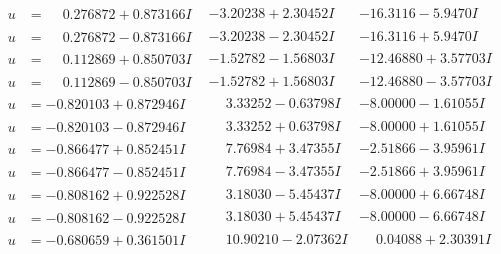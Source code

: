 \documentclass[1p]{elsarticle_modified}
\theoremstyle{definition}
\begin{document}
$$\begin{array}{c|c|c}
\begin{aligned}
u &= \phantom{-}0.276872 + 0.873166 I\end{aligned}
 & -3.20238 + 2.30452 I & -16.3116 - 5.9470 I \\ \hline\begin{aligned}
u &= \phantom{-}0.276872 - 0.873166 I\end{aligned}
 & -3.20238 - 2.30452 I & -16.3116 + 5.9470 I \\ \hline\begin{aligned}
u &= \phantom{-}0.112869 + 0.850703 I\end{aligned}
 & -1.52782 - 1.56803 I & -12.46880 + 3.57703 I \\ \hline\begin{aligned}
u &= \phantom{-}0.112869 - 0.850703 I\end{aligned}
 & -1.52782 + 1.56803 I & -12.46880 - 3.57703 I \\ \hline\begin{aligned}
u &= -0.820103 + 0.872946 I\end{aligned}
 & \phantom{-}3.33252 - 0.63798 I & -8.00000 - 1.61055 I \\ \hline\begin{aligned}
u &= -0.820103 - 0.872946 I\end{aligned}
 & \phantom{-}3.33252 + 0.63798 I & -8.00000 + 1.61055 I \\ \hline\begin{aligned}
u &= -0.866477 + 0.852451 I\end{aligned}
 & \phantom{-}7.76984 + 3.47355 I & -2.51866 - 3.95961 I \\ \hline\begin{aligned}
u &= -0.866477 - 0.852451 I\end{aligned}
 & \phantom{-}7.76984 - 3.47355 I & -2.51866 + 3.95961 I \\ \hline\begin{aligned}
u &= -0.808162 + 0.922528 I\end{aligned}
 & \phantom{-}3.18030 - 5.45437 I & -8.00000 + 6.66748 I \\ \hline\begin{aligned}
u &= -0.808162 - 0.922528 I\end{aligned}
 & \phantom{-}3.18030 + 5.45437 I & -8.00000 - 6.66748 I \\ \hline\begin{aligned}
u &= -0.680659 + 0.361501 I\end{aligned}
 & \phantom{-}10.90210 - 2.07362 I & \phantom{-}0.04088 + 2.30391 I \\ \hline\begin{aligned}

\end{aligned}
\end{array}$$
\end{document}
